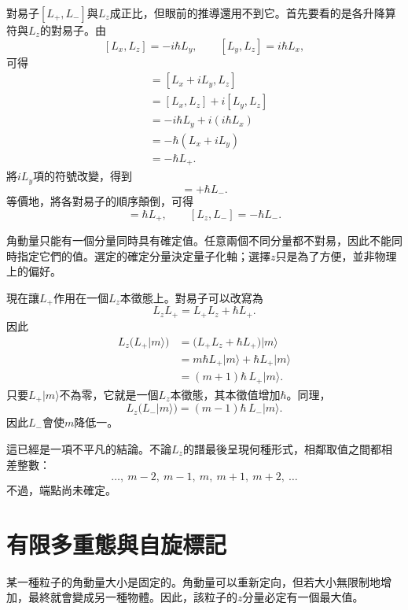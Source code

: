 對易子\([L_+,L_-]\)與\(L_z\)成正比，但眼前的推導還用不到它。首先要看的是各升降算符與\(L_z\)的對易子。由
\[
[L_x,L_z]=-i\hbar L_y,
\qquad
[L_y,L_z]=i\hbar L_x,
\]
可得
\begin{align}
[L_+,L_z]
&=[L_x+iL_y,L_z] \\
&=[L_x,L_z]+i[L_y,L_z] \\
&=-i\hbar L_y+i(i\hbar L_x) \\
&=-\hbar(L_x+iL_y) \\
&=-\hbar L_+.
\end{align}
將\(iL_y\)項的符號改變，得到
\begin{equation}
[L_-,L_z]=+\hbar L_-.
\end{equation}
等價地，將各對易子的順序顛倒，可得
\begin{equation}
[L_z,L_+]=\hbar L_+,
\qquad
[L_z,L_-]=-\hbar L_-.
\end{equation}

角動量只能有一個分量同時具有確定值。任意兩個不同分量都不對易，因此不能同時指定它們的值。選定的確定分量決定量子化軸；選擇\(z\)只是為了方便，並非物理上的偏好。

現在讓\(L_+\)作用在一個\(L_z\)本徵態上。對易子可以改寫為
\begin{equation}
L_zL_+=L_+L_z+\hbar L_+.
\end{equation}
因此
\begin{align}
L_z\bigl(L_+\lvert m\rangle\bigr)
&=\bigl(L_+L_z+\hbar L_+\bigr)\lvert m\rangle \\
&=m\hbar L_+\lvert m\rangle+\hbar L_+\lvert m\rangle \\
&=(m+1)\hbar\,L_+\lvert m\rangle.
\end{align}
只要\(L_+\lvert m\rangle\)不為零，它就是一個\(L_z\)本徵態，其本徵值增加\(\hbar\)。同理，
\begin{equation}
L_z\bigl(L_-\lvert m\rangle\bigr)
=(m-1)\hbar\,L_-\lvert m\rangle.
\end{equation}
因此\(L_-\)會使\(m\)降低一。

這已經是一項不平凡的結論。不論\(L_z\)的譜最後呈現何種形式，相鄰取值之間都相差整數：
\begin{equation}
\ldots,\ m-2,\ m-1,\ m,\ m+1,\ m+2,\ \ldots
\end{equation}
不過，端點尚未確定。

\section{有限多重態與自旋標記}

某一種粒子的角動量大小是固定的。角動量可以重新定向，但若大小無限制地增加，最終就會變成另一種物體。因此，該粒子的\(z\)分量必定有一個最大值。

